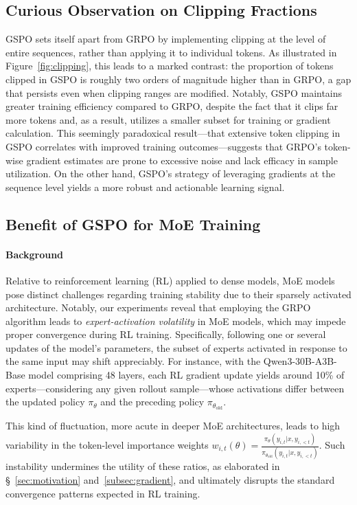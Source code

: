 \subsection{Curious Observation on Clipping Fractions}

GSPO sets itself apart from GRPO by implementing clipping at the level of entire sequences, rather than applying it to individual tokens. As illustrated in Figure~\ref{fig:clipping}, this leads to a marked contrast: the proportion of tokens clipped in GSPO is roughly two orders of magnitude higher than in GRPO, a gap that persists even when clipping ranges are modified. Notably, GSPO maintains greater training efficiency compared to GRPO, despite the fact that it clips far more tokens and, as a result, utilizes a smaller subset for training or gradient calculation. This seemingly paradoxical result—that extensive token clipping in GSPO correlates with improved training outcomes—suggests that GRPO’s token-wise gradient estimates are prone to excessive noise and lack efficacy in sample utilization. On the other hand, GSPO's strategy of leveraging gradients at the sequence level yields a more robust and actionable learning signal.

\subsection{Benefit of GSPO for MoE Training}
\label{subsec:routing_replay}

\paragraph{Background}
Relative to reinforcement learning (RL) applied to dense models, MoE models pose distinct challenges regarding training stability due to their sparsely activated architecture. Notably, our experiments reveal that employing the GRPO algorithm leads to \textit{expert-activation volatility} in MoE models, which may impede proper convergence during RL training. Specifically, following one or several updates of the model's parameters, the subset of experts activated in response to the same input may shift appreciably. For instance, with the Qwen3-30B-A3B-Base model comprising 48 layers, each RL gradient update yields around 10\% of experts—considering any given rollout sample—whose activations differ between the updated policy $\pi_{\theta}$ and the preceding policy $\pi_{\theta_\text{old}}$.

This kind of fluctuation, more acute in deeper MoE architectures, leads to high variability in the token-level importance weights $w_{i,t}(\theta) = \frac{ \pi_{\theta} (y_{i,t} | x, y_{i,<t}) }{ \pi_{\theta_\text{old}} (y_{i,t} | x,y_{i,<t})}$. Such instability undermines the utility of these ratios, as elaborated in \S~\ref{sec:motivation} and~\ref{subsec:gradient}, and ultimately disrupts the standard convergence patterns expected in RL training.

